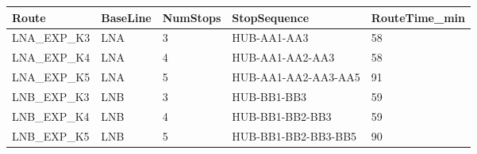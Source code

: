 \begin{tabular}{lllll}
\toprule
Route & BaseLine & NumStops & StopSequence & RouteTime\_min \\
\midrule
LNA\_EXP\_K3 & LNA & 3 & HUB-AA1-AA3 & 58 \\
LNA\_EXP\_K4 & LNA & 4 & HUB-AA1-AA2-AA3 & 58 \\
LNA\_EXP\_K5 & LNA & 5 & HUB-AA1-AA2-AA3-AA5 & 91 \\
LNB\_EXP\_K3 & LNB & 3 & HUB-BB1-BB3 & 59 \\
LNB\_EXP\_K4 & LNB & 4 & HUB-BB1-BB2-BB3 & 59 \\
LNB\_EXP\_K5 & LNB & 5 & HUB-BB1-BB2-BB3-BB5 & 90 \\
\bottomrule
\end{tabular}
